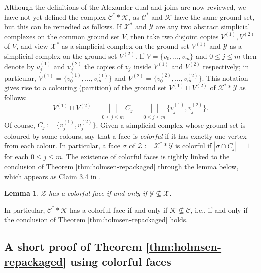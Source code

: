 \documentclass[a4paper,11pt,reqno, english]{amsart}
\newtheorem{lemma}[theorem]{Lemma}
\theoremstyle{definition}
\theoremstyle{remark}
\begin{document}
Although the definitions of the Alexander dual and joins are now reviewed, we have not yet defined the complex $\mathscr{C}^**\mathscr{K}$, as $\mathscr{C}^*$ and $\mathscr{K}$ have the same ground set, but this can be remedied as follows. If $\mathscr{X}^*$ and $\mathscr{Y}$ are any two abstract simplicial complexes on the common ground set $V$, then take two disjoint copies $V^{(1)},V^{(2)}$ of $V$, and view $\mathscr{X}^*$ as a simplicial complex on the ground set $V^{(1)}$ and $\mathscr{Y}$ as a simplicial complex on the ground set $V^{(2)}$. If $V=\{v_0,\ldots,v_m\}$ and $0\leq j\leq m$ then denote by $v_j^{(1)}$ and $v_j^{(2)}$ the copies of $v_j$ inside $V^{(1)}$ and $V^{(2)}$ respectively; in particular, $V^{(1)}=\{v_0^{(1)},\ldots,v_m^{(1)}\}$ and $V^{(2)}=\{v_0^{(2)},\ldots,v_m^{(2)}\}$. This notation gives rise to a colouring (partition) of the ground set $V^{(1)}\sqcup V^{(2)}$ of $\mathscr{X}^**\mathscr{Y}$ as follows:
\[
    V^{(1)}\sqcup V^{(2)}=\bigsqcup_{0\leq j\leq m}C_j=\bigsqcup_{0\leq j\leq m}\{v_j^{(1)},v_j^{(2)}\}.
\]
Of course, $C_j:=\{v_j^{(1)},v_j^{(2)}\}$. Given a simplicial complex whose ground set is coloured by some colours, say that a face is \emph{colorful} if it has exactly one vertex from each colour. In particular, a face $\sigma$ of $\mathscr{Z}:=\mathscr{X}^**\mathscr{Y}$ is colorful if $|\sigma\cap C_j|= 1$ for each $0\leq j\leq m$. The existence of colorful faces is tightly linked to the conclusion of Theorem \ref{thm:holmsen-repackaged} through the lemma below, which appears as Claim 3.4 in \cite{Holmsen2016}.
\begin{lemma}\label{lem:colorful-faces-vs-containment}
    $\mathscr{Z}$ has a colorful face if and only if $\mathscr{Y}\nsubseteq \mathscr{X}$.
\end{lemma}
In particular, $\mathscr{C}^**\mathscr{K}$ has a colorful face if and only if $\mathscr{K}\nsubseteq\mathscr{C}$, i.e., if and only if the conclusion of Theorem \ref{thm:holmsen-repackaged} holds.

\medskip
\subsection{A short proof of Theorem \ref{thm:holmsen-repackaged} using colorful faces}\label{sec:the-method:holmsen}
\medskip
\end{document}
